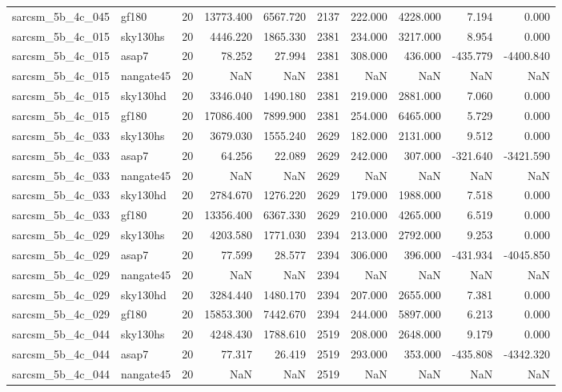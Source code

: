 \begin{tabular}{llrrrrrrrr}
sarcsm\_5b\_4c\_045 & gf180 & 20 & 13773.400 & 6567.720 & 2137 & 222.000 & 4228.000 & 7.194 & 0.000 \\
sarcsm\_5b\_4c\_015 & sky130hs & 20 & 4446.220 & 1865.330 & 2381 & 234.000 & 3217.000 & 8.954 & 0.000 \\
sarcsm\_5b\_4c\_015 & asap7 & 20 & 78.252 & 27.994 & 2381 & 308.000 & 436.000 & -435.779 & -4400.840 \\
sarcsm\_5b\_4c\_015 & nangate45 & 20 & NaN & NaN & 2381 & NaN & NaN & NaN & NaN \\
sarcsm\_5b\_4c\_015 & sky130hd & 20 & 3346.040 & 1490.180 & 2381 & 219.000 & 2881.000 & 7.060 & 0.000 \\
sarcsm\_5b\_4c\_015 & gf180 & 20 & 17086.400 & 7899.900 & 2381 & 254.000 & 6465.000 & 5.729 & 0.000 \\
sarcsm\_5b\_4c\_033 & sky130hs & 20 & 3679.030 & 1555.240 & 2629 & 182.000 & 2131.000 & 9.512 & 0.000 \\
sarcsm\_5b\_4c\_033 & asap7 & 20 & 64.256 & 22.089 & 2629 & 242.000 & 307.000 & -321.640 & -3421.590 \\
sarcsm\_5b\_4c\_033 & nangate45 & 20 & NaN & NaN & 2629 & NaN & NaN & NaN & NaN \\
sarcsm\_5b\_4c\_033 & sky130hd & 20 & 2784.670 & 1276.220 & 2629 & 179.000 & 1988.000 & 7.518 & 0.000 \\
sarcsm\_5b\_4c\_033 & gf180 & 20 & 13356.400 & 6367.330 & 2629 & 210.000 & 4265.000 & 6.519 & 0.000 \\
sarcsm\_5b\_4c\_029 & sky130hs & 20 & 4203.580 & 1771.030 & 2394 & 213.000 & 2792.000 & 9.253 & 0.000 \\
sarcsm\_5b\_4c\_029 & asap7 & 20 & 77.599 & 28.577 & 2394 & 306.000 & 396.000 & -431.934 & -4045.850 \\
sarcsm\_5b\_4c\_029 & nangate45 & 20 & NaN & NaN & 2394 & NaN & NaN & NaN & NaN \\
sarcsm\_5b\_4c\_029 & sky130hd & 20 & 3284.440 & 1480.170 & 2394 & 207.000 & 2655.000 & 7.381 & 0.000 \\
sarcsm\_5b\_4c\_029 & gf180 & 20 & 15853.300 & 7442.670 & 2394 & 244.000 & 5897.000 & 6.213 & 0.000 \\
sarcsm\_5b\_4c\_044 & sky130hs & 20 & 4248.430 & 1788.610 & 2519 & 208.000 & 2648.000 & 9.179 & 0.000 \\
sarcsm\_5b\_4c\_044 & asap7 & 20 & 77.317 & 26.419 & 2519 & 293.000 & 353.000 & -435.808 & -4342.320 \\
sarcsm\_5b\_4c\_044 & nangate45 & 20 & NaN & NaN & 2519 & NaN & NaN & NaN & NaN \\

\end{tabular}
